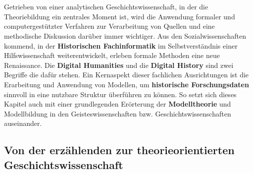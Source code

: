 \documentclass[12pt,a4paper]{article}
\begin{document}
\\
\\
Getrieben von einer analytischen Geschichtswissenschaft, in der die Theoriebildung ein zentrales Moment ist, wird die Anwendung formaler und computergestützter Verfahren zur Verarbeitung von Quellen und eine methodische Diskussion darüber immer wichtiger. Aus den Sozialwissenschaften kommend, in der \textbf{Historischen Fachinformatik} im Selbstverständnis einer Hilfswissenschaft weiterentwickelt, erleben formale Methoden eine neue Renaissance. Die \textbf{Digital Humanities} und die \textbf{Digital History} sind zwei Begriffe die dafür stehen. Ein Kernaspekt dieser fachlichen Ausrichtungen ist die Erarbeitung und Anwendung von Modellen, um \textbf{historische Forschungsdaten} sinnvoll in eine nutzbare  Struktur überführen zu können. So setzt sich dieses Kapitel auch mit einer grundlegenden Erörterung der \textbf{Modelltheorie} und Modellbildung in den Geisteswissenschaften bzw. Geschichtswissenschaften auseinander.

\subsection{Von der erzählenden zur theorieorientierten Geschichtswissenschaft}
\end{document}
